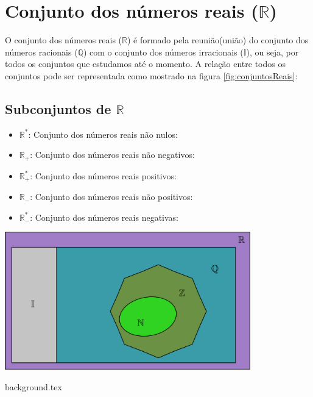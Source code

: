 \documentclass[10pt]{article}
\begin{document}
\section*{Conjunto dos números reais (\( \mathbb{R} \))}
O conjunto dos números reais (\( \mathbb{R} \)) é formado pela reunião(união) do conjunto dos números racionais (\( \mathbb{Q}\)) com o conjunto dos números irracionais (\( \mathbb{I}\)), ou seja, por todos os conjuntos que estudamos até o momento. A relação entre todos os conjuntos pode ser representada como mostrado na figura \ref{fig:conjuntosReais}:
\begin{multicols}{2}
\subsection*{Subconjuntos de \(\mathbb{R}\)}
\begin{itemize}
        \item \( \mathbb{R}^* \): Conjunto dos números reais não nulos:
        \item \( \mathbb{R}_+ \): Conjunto dos números reais não negativos:
        \item \( \mathbb{R}^*_+ \): Conjunto dos números reais positivos:
        \item  \( \mathbb{R}_- \): Conjunto dos números reais não positivos:
        \item  \( \mathbb{R}^*_- \): Conjunto dos números reais negativas:
    \end{itemize}
\columnbreak
\bigskip
\noindent
    \begin{minipage}{\linewidth}
        \centering 
        \includegraphics[width=0.8\textwidth]{imgs/conjuntosNumerico/conjuntosReais.pdf}
        \label{fig:conjuntosReais} 
    \end{minipage}%
\end{multicols} 
\newpage
{background.tex} %
\end{document}
